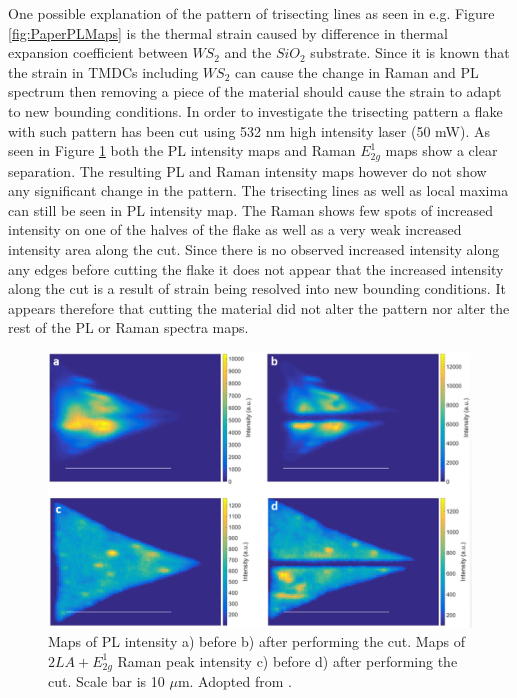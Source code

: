 One possible explanation of the pattern of trisecting lines as seen in e.g. Figure \ref{fig:PaperPLMaps} is the thermal strain caused by difference in thermal expansion coefficient between $WS_2$ and the $SiO_2$ substrate. Since it is known that the strain in TMDCs including $WS_2$ can cause the change in Raman and PL spectrum \cite{Liu2014}\cite{Hui2013} then removing a piece of the material should cause the strain to adapt to new bounding conditions. In order to investigate the trisecting pattern a flake with such pattern has been cut using 532 nm high intensity laser (50 mW). As seen in Figure \ref{fig:PaperSIMapsCutting} both the PL intensity maps and Raman $E^1_{2g}$ maps show a clear separation. The resulting PL and Raman intensity maps however do not show any significant change in the pattern. The trisecting lines as well as local maxima can still be seen in PL intensity map. The Raman shows few spots of increased intensity on one of the halves of the flake as well as a very weak increased intensity area along the cut. Since there is no observed increased intensity along any edges before cutting the flake it does not appear that the increased intensity along the cut is a result of strain being resolved into new bounding conditions. It appears therefore that cutting the material did not alter the pattern nor alter the rest of the PL or Raman spectra maps.

\begin{figure}[h]
	\begin{center}
		\includegraphics[scale=0.3]{PaperSIMapsCutting.png}
		\caption{Maps of PL intensity a) before b) after performing the cut. Maps of $2LA+E^1_{2g}$ Raman peak intensity c) before d) after performing the cut. Scale bar is 10 $\mu$m. Adopted from \cite{Reale2017}.}
		\label{fig:PaperSIMapsCutting}
	\end{center}
\end{figure}

